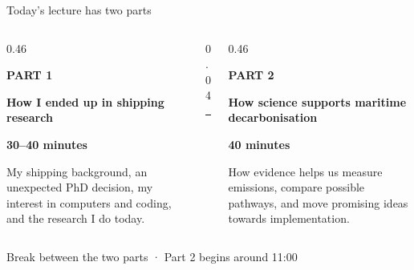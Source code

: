 \documentclass[aspectratio=169,11pt]{beamer}
\newcommand{\partlabel}[1]{%
  {\color{Navy}\fontsize{9}{11}\selectfont\bfseries\MakeUppercase{#1}\par}
}
\begin{document}
\begin{frame}{Today’s lecture has two parts}
  \vspace{0.22cm}
  \begin{columns}[T,onlytextwidth]
    \begin{column}{0.46\textwidth}
      \partlabel{Part 1}
      \vspace{0.22cm}
      {\color{Ink}\fontsize{16}{19}\selectfont\bfseries
        How I ended up in shipping research
      \par}
      \vspace{0.13cm}
      {\color{Navy}\fontsize{10.5}{13}\selectfont\bfseries 30–40 minutes\par}
      \vspace{0.34cm}
      {\color{Ink}\fontsize{11.5}{15.5}\selectfont
        My shipping background, an unexpected PhD decision, my interest in
        computers and coding, and the research I do today.
      \par}
    \end{column}

    \begin{column}{0.04\textwidth}
      \centering
      {\color{RuleGray}\rule{0.6pt}{3.45cm}}
    \end{column}

    \begin{column}{0.46\textwidth}
      \partlabel{Part 2}
      \vspace{0.22cm}
      {\color{Ink}\fontsize{16}{19}\selectfont\bfseries
        How science supports maritime decarbonisation
      \par}
      \vspace{0.13cm}
      {\color{Navy}\fontsize{10.5}{13}\selectfont\bfseries 40 minutes\par}
      \vspace{0.34cm}
      {\color{Ink}\fontsize{11.5}{15.5}\selectfont
        How evidence helps us measure emissions, compare possible pathways,
        and move promising ideas towards implementation.
      \par}
    \end{column}
  \end{columns}

  \vfill
  {\color{Muted}\fontsize{8.5}{10.5}\selectfont
    Break between the two parts · Part 2 begins around 11:00
  \par}
\end{frame}
\end{document}
